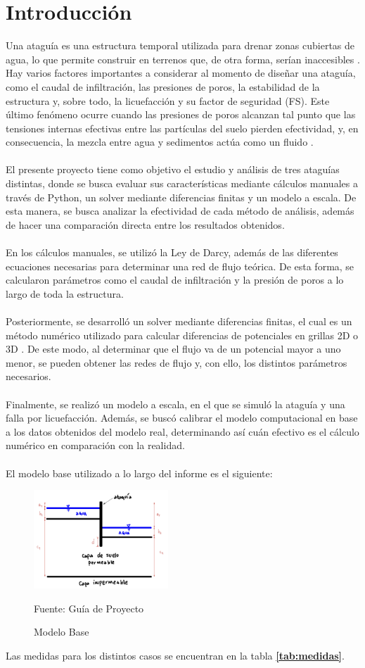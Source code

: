 \section*{Introducción}

Una ataguía es una estructura temporal utilizada para drenar zonas cubiertas de agua, lo que permite construir en terrenos que, de otra forma, serían inaccesibles \textbf{\cite{madanayaka2018}}. Hay varios factores importantes a considerar al momento de diseñar una ataguía, como el caudal de infiltración, las presiones de poros, la estabilidad de la estructura y, sobre todo, la licuefacción y su factor de seguridad (FS). Este último fenómeno ocurre cuando las presiones de poros alcanzan tal punto que las tensiones internas efectivas entre las partículas del suelo pierden efectividad, y, en consecuencia, la mezcla entre agua y sedimentos actúa como un fluido \textbf{\cite{sumer2009}}.
\\ \\
El presente proyecto tiene como objetivo el estudio y análisis de tres ataguías distintas, donde se busca evaluar sus características mediante cálculos manuales a través de Python, un solver mediante diferencias finitas y un modelo a escala. De esta manera, se busca analizar la efectividad de cada método de análisis, además de hacer una comparación directa entre los resultados obtenidos.
\\ \\
En los cálculos manuales, se utilizó la Ley de Darcy, además de las diferentes ecuaciones necesarias para determinar una red de flujo teórica. De esta forma, se calcularon parámetros como el caudal de infiltración y la presión de poros a lo largo de toda la estructura.
\\ \\
Posteriormente, se desarrolló un solver mediante diferencias finitas, el cual es un método numérico utilizado para calcular diferencias de potenciales en grillas 2D o 3D \textbf{\cite{zhang2005}}. De este modo, al determinar que el flujo va de un potencial mayor a uno menor, se pueden obtener las redes de flujo y, con ello, los distintos parámetros necesarios.
\\ \\
Finalmente, se realizó un modelo a escala, en el que se simuló la ataguía y una falla por licuefacción. Además, se buscó calibrar el modelo computacional en base a los datos obtenidos del modelo real, determinando así cuán efectivo es el cálculo numérico en comparación con la realidad.
\\ \\
El modelo base utilizado a lo largo del informe es el siguiente:

\begin{figure}[H]
    \centering
    \includegraphics[width=0.45\textwidth]{FOTOS/modelo_base.png}
    \caption{Modelo Base}
    Fuente: Guía de Proyecto
    \label{fig:modelo_base}
\end{figure}

Las medidas para los distintos casos se encuentran en la tabla \textbf{\ref{tab:medidas}}.
